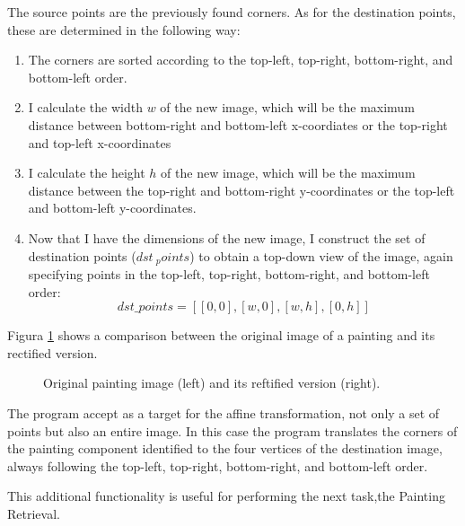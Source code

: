 \documentclass[10pt,twocolumn,letterpaper]{article}
\begin{document}
The source points are the previously found corners. As for the destination points, these are determined in the following way:
\begin{enumerate}
   \item The corners are sorted according to the top-left, top-right, bottom-right, and bottom-left order.
   
   \item I calculate the width $w$ of the new image, which will be the maximum distance between bottom-right and bottom-left x-coordiates or the top-right and top-left x-coordinates
   
   \item I calculate the height $h$ of the new image, which will be the maximum distance between the top-right and bottom-right y-coordinates or the top-left and bottom-left y-coordinates. 
   
   \item Now that I have the dimensions of the new image, I construct the set of destination points ($dst\ _points$) to obtain a top-down view of the image, again specifying points in the top-left, top-right, bottom-right, and bottom-left order:
   \begin{equation}
      dst\_points = [[0, 0], [w, 0], [w, h], [0, h]]
      \label{eq:1}
   \end{equation}
\end{enumerate}


Figura \ref{fig:rectifyComparison} shows a comparison between the original image of a painting and its rectified version.

\begin{figure}[t]
   \begin{center}
   \fbox{\rule{0pt}{2in} \rule{0.9\linewidth}{0pt}}
   \end{center}
      \caption{Original painting image (left) and its reftified version (right).}
   \label{fig:rectifyComparison}
\end{figure}

The program accept as a target for the affine transformation, not only a set of points but also an entire image. In this case the program translates the corners of the painting component identified to the four vertices of the destination image, always following the top-left, top-right, bottom-right, and bottom-left order. 

This additional functionality is useful for performing the next task,the Painting Retrieval.
\end{document}
